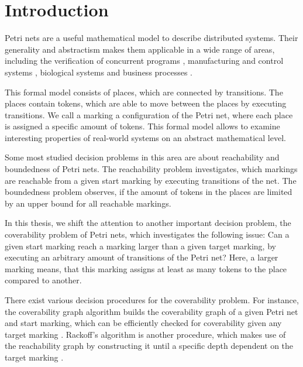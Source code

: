 \chapter{Introduction}\label{chapter:introduction}

%

Petri nets are a useful mathematical model to describe distributed systems. Their generality and abstractism makes them applicable in a wide range of areas, including the verification of concurrent programs \cite{german_92,kaiser_14}, manufacturing and control systems \cite{silva_97, wenzelburger_19}, biological systems \cite{carvalho_18, cherdal_18} and business processes \cite{hee_13}.


This formal model consists of places, which are connected by transitions. The places contain tokens, which are able to move between the places by executing transitions. We call a marking a configuration of the Petri net, where each place is assigned a specific amount of tokens.
This formal model allows to examine interesting properties of real-world systems on an abstract mathematical level.

Some most studied decision problems in this area are about reachability and boundedness of Petri nets. The reachability problem investigates, which markings are reachable from a given start marking by executing transitions of the net. The boundedness problem observes, if the amount of tokens in the places are limited by an upper bound for all reachable markings.

In this thesis, we shift the attention to another important decision problem, the coverability problem of Petri nets, which investigates the following issue:
Can a given start marking reach a marking larger than a given target marking, by executing an arbitrary amount of transitions of the Petri net? Here, a larger marking means, that this marking assigns at least as many tokens to the place compared to another.


There exist various decision procedures for the coverability problem. For instance, the coverability graph algorithm builds the coverability graph of a given Petri net and start marking, which can be efficiently checked for coverability given any target marking \cite{finkel_91}. Rackoff's algorithm is another procedure, which makes use of the reachability graph by constructing it until a specific depth dependent on the target marking \cite{rackoff_78,esparza_19}. 

